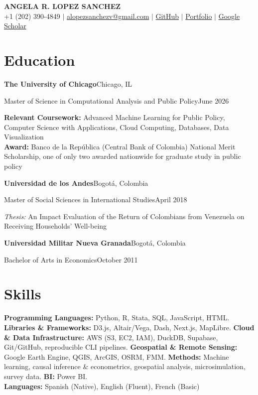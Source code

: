 \documentclass[10pt]{article}
\newcommand{\org}[2]{\noindent\textbf{#1}\hfill #2\par\vspace{0pt}}
\newcommand{\edu}[2]{\noindent #1\hfill #2\par\vspace{0pt}}
\newcommand{\entrygap}{\vspace{6pt}}
\begin{document}

\begin{center}
  {\LARGE\textbf{ANGELA R. LOPEZ SANCHEZ}}\\[4pt]
  +1 (202) 390-4849 $|$
  \href{mailto:alopezsanchezv@gmail.com}{alopezsanchezv@gmail.com} $|$
  \href{https://github.com/AngelaLop}{GitHub} $|$
  \href{https://angelalop.github.io/AngelaLopezS/}{Portfolio} $|$
  \href{https://scholar.google.com/citations?user=wfO9incAAAAJ&hl=en}{Google Scholar}
\end{center}

\vspace{3pt}

\section{Education}

\org{The University of Chicago}{Chicago, IL}
\edu{Master of Science in Computational Analysis and Public Policy}{June 2026}
\textbf{Relevant Coursework:} Advanced Machine Learning for Public Policy, Computer Science with Applications, Cloud Computing, Databases, Data Visualization\\
\textbf{Award:} Banco de la Rep\'ublica (Central Bank of Colombia) National Merit Scholarship, one of only two awarded nationwide for graduate study in public policy

\entrygap
\org{Universidad de los Andes}{Bogot\'a, Colombia}
\edu{Master of Social Sciences in International Studies}{April 2018}
\textit{Thesis:} An Impact Evaluation of the Return of Colombians from Venezuela on Receiving Households' Well-being

\entrygap
\org{Universidad Militar Nueva Granada}{Bogot\'a, Colombia}
\edu{Bachelor of Arts in Economics}{October 2011}

\section{Skills}

\textbf{Programming Languages:} Python, R, Stata, SQL, JavaScript, HTML.
\textbf{Libraries \& Frameworks:} D3.js, Altair/Vega, Dash, Next.js, MapLibre.
\textbf{Cloud \& Data Infrastructure:} AWS (S3, EC2, IAM), DuckDB, Supabase, Git/GitHub, reproducible CLI pipelines.
\textbf{Geospatial \& Remote Sensing:} Google Earth Engine, QGIS, ArcGIS, OSRM, FMM.
\textbf{Methods:} Machine learning, causal inference \& econometrics, geospatial analysis, microsimulation, survey data.
\textbf{BI:} Power BI.\\
\textbf{Languages:} Spanish (Native), English (Fluent), French (Basic)
\end{document}
